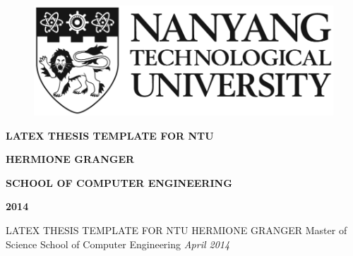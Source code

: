 \documentclass[dvips,a4paper,12pt]{report}
\begin{document}

\thispagestyle{empty}
\begin{center}

\begin{figure}[!htbp]
    \centering
    \vspace{2mm}
    \includegraphics[scale=1]{figures/NTU.eps}
    \label{fig:NTU_Logo}
\end{figure}

\vspace{5.0cm}
\textbf{\Large \MakeUppercase{LaTeX Thesis Template for NTU}}

\vspace{\fill}

\textbf{\MakeUppercase{Hermione Granger}}

\textbf{SCHOOL OF COMPUTER ENGINEERING}

\textbf{2014}

\end{center}

\newpage

\clearpage
\setcounter{page}{1}


\thesistitle
	{\MakeUppercase{LaTeX Thesis Template for NTU}}
	{\MakeUppercase{Hermione Granger}}
	{Master of Science}
	{School of Computer Engineering}
	{\emph{April 2014}}















%
\end{document}
